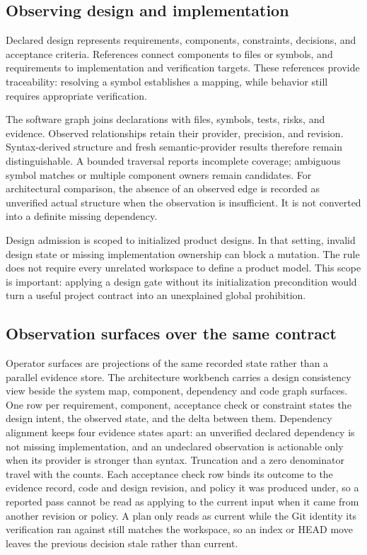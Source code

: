 \subsection{Observing design and implementation}
Declared design represents requirements, components, constraints, decisions, and acceptance criteria. References connect components to files or symbols, and requirements to implementation and verification targets. These references provide traceability: resolving a symbol establishes a mapping, while behavior still requires appropriate verification.

The software graph joins declarations with files, symbols, tests, risks, and evidence. Observed relationships retain their provider, precision, and revision. Syntax-derived structure and fresh semantic-provider results therefore remain distinguishable. A bounded traversal reports incomplete coverage; ambiguous symbol matches or multiple component owners remain candidates. For architectural comparison, the absence of an observed edge is recorded as unverified actual structure when the observation is insufficient. It is not converted into a definite missing dependency.

Design admission is scoped to initialized product designs. In that setting, invalid design state or missing implementation ownership can block a mutation. The rule does not require every unrelated workspace to define a product model. This scope is important: applying a design gate without its initialization precondition would turn a useful project contract into an unexplained global prohibition.

\subsection{Observation surfaces over the same contract}
Operator surfaces are projections of the same recorded state rather than a parallel evidence store. The architecture workbench carries a design consistency view beside the system map, component, dependency and code graph surfaces. One row per requirement, component, acceptance check or constraint states the design intent, the observed state, and the delta between them. Dependency alignment keeps four evidence states apart: an unverified declared dependency is not missing implementation, and an undeclared observation is actionable only when its provider is stronger than syntax. Truncation and a zero denominator travel with the counts. Each acceptance check row binds its outcome to the evidence record, code and design revision, and policy it was produced under, so a reported pass cannot be read as applying to the current input when it came from another revision or policy. A plan only reads as current while the Git identity its verification ran against still matches the workspace, so an index or HEAD move leaves the previous decision stale rather than current.

